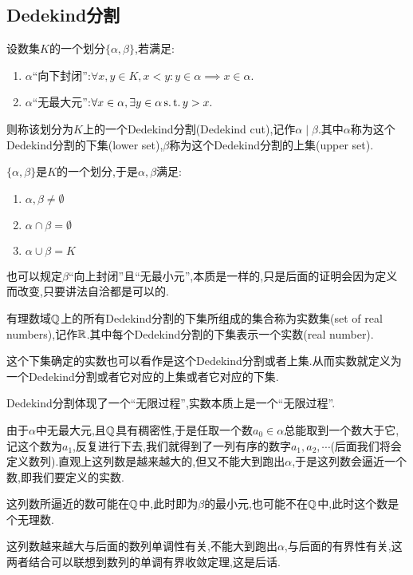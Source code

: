\subsection{Dedekind分割}

\begin{definition}
    [Dedekind分割]
设数集$K$的一个划分$\{\alpha,\beta\}$,若满足:
    \begin{enumerate}
        \item $\alpha$“向下封闭”:$\forall x,y\in K,x<y:y\in \alpha\implies x\in \alpha.$
        \item $\alpha$“无最大元”:$\forall x\in\alpha,\exists y\in\alpha\operatorname{s.t.} y>x.$
    \end{enumerate}
    则称该划分为$K$上的一个Dedekind分割(Dedekind cut),记作$\alpha\mid\beta$.其中$\alpha$称为这个Dedekind分割的下集(lower set),$\beta$称为这个Dedekind分割的上集(upper set).
\end{definition}

\begin{remark}
    $\{\alpha,\beta\}$是$K$的一个划分,于是$\alpha,\beta$满足:
    \begin{enumerate}
        \item $\alpha,\beta\ne\emptyset$
        \item $\alpha\cap\beta =\emptyset$
        \item $\alpha\cup\beta =K$
    \end{enumerate}
\end{remark}

\begin{remark}
    也可以规定$\beta$“向上封闭”且“无最小元”,本质是一样的,只是后面的证明会因为定义而改变,只要讲法自洽都是可以的.
\end{remark}

\begin{definition}
    [实数集]
    有理数域$\mathbb{Q}$上的所有Dedekind分割的下集所组成的集合称为实数集(set of real numbers),记作$\mathbb{R}$.其中每个Dedekind分割的下集表示一个实数(real number).
\end{definition}

\begin{note}
    这个下集确定的实数也可以看作是这个Dedekind分割或者上集.从而实数就定义为一个Dedekind分割或者它对应的上集或者它对应的下集.
\end{note}

    Dedekind分割体现了一个“无限过程”,实数本质上是一个“无限过程”.
    
    由于$\alpha$中无最大元,且$\mathbb{Q}$具有稠密性,于是任取一个数$a_0\in\alpha$总能取到一个数大于它,记这个数为$a_1$,反复进行下去,我们就得到了一列有序的数字$a_1,a_2,\cdots$(后面我们将会定义数列).直观上这列数是越来越大的,但又不能大到跑出$\alpha$,于是这列数会逼近一个数,即我们要定义的实数.

\begin{note}
    这列数所逼近的数可能在$\mathbb{Q}$中,此时即为$\beta$的最小元,也可能不在$\mathbb{Q}$中,此时这个数是个无理数.
\end{note}

\begin{note}
    这列数越来越大与后面的数列单调性有关,不能大到跑出$\alpha$,与后面的有界性有关,这两者结合可以联想到数列的单调有界收敛定理,这是后话.
\end{note}
